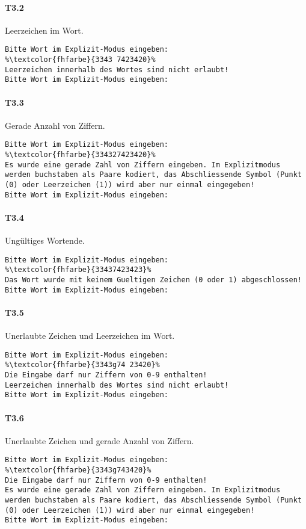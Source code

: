 \paragraph*{T3.2} Leerzeichen im Wort.
\begin{lstlisting}[escapechar=\%]
Bitte Wort im Explizit-Modus eingeben:
%\textcolor{fhfarbe}{3343 7423420}%
Leerzeichen innerhalb des Wortes sind nicht erlaubt!
Bitte Wort im Explizit-Modus eingeben:
\end{lstlisting}

\paragraph*{T3.3} Gerade Anzahl von Ziffern.
\begin{lstlisting}[escapechar=\%]
Bitte Wort im Explizit-Modus eingeben:
%\textcolor{fhfarbe}{334327423420}%
Es wurde eine gerade Zahl von Ziffern eingeben. Im Explizitmodus werden buchstaben als Paare kodiert, das Abschliessende Symbol (Punkt (0) oder Leerzeichen (1)) wird aber nur einmal eingegeben!
Bitte Wort im Explizit-Modus eingeben:
\end{lstlisting}

\paragraph*{T3.4} Ungültiges Wortende.
\begin{lstlisting}[escapechar=\%]
Bitte Wort im Explizit-Modus eingeben:
%\textcolor{fhfarbe}{33437423423}%
Das Wort wurde mit keinem Gueltigen Zeichen (0 oder 1) abgeschlossen!
Bitte Wort im Explizit-Modus eingeben:
\end{lstlisting}

\paragraph*{T3.5} Unerlaubte Zeichen und Leerzeichen im Wort.
\begin{lstlisting}[escapechar=\%]
Bitte Wort im Explizit-Modus eingeben:
%\textcolor{fhfarbe}{3343g74 23420}%
Die Eingabe darf nur Ziffern von 0-9 enthalten!
Leerzeichen innerhalb des Wortes sind nicht erlaubt!
Bitte Wort im Explizit-Modus eingeben:
\end{lstlisting}

\paragraph*{T3.6} Unerlaubte Zeichen und gerade Anzahl von Ziffern.
\begin{lstlisting}[escapechar=\%]
Bitte Wort im Explizit-Modus eingeben:
%\textcolor{fhfarbe}{3343g743420}%
Die Eingabe darf nur Ziffern von 0-9 enthalten!
Es wurde eine gerade Zahl von Ziffern eingeben. Im Explizitmodus werden buchstaben als Paare kodiert, das Abschliessende Symbol (Punkt (0) oder Leerzeichen (1)) wird aber nur einmal eingegeben!
Bitte Wort im Explizit-Modus eingeben:
\end{lstlisting}

